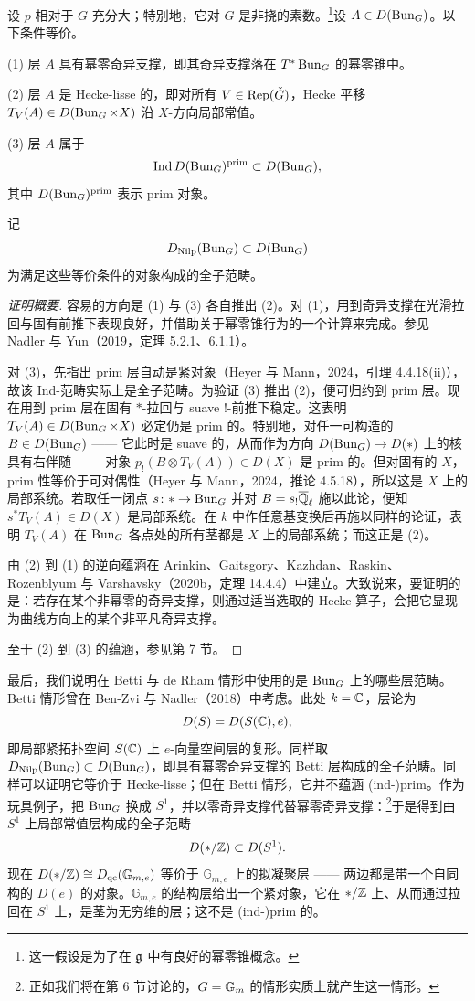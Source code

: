 \begin{theorem}
设 $p$ 相对于 $G$ 充分大；特别地，它对 $G$ 是非挠的素数。\footnote{这一假设是为了在 $\mathfrak{g}$ 中有良好的幂零锥概念。}设 $A\in D(\operatorname{Bun}_G)$。以下条件等价。

(1) 层 $A$ 具有幂零奇异支撑，即其奇异支撑落在 $T^*\operatorname{Bun}_G$ 的幂零锥中。

(2) 层 $A$ 是 Hecke-lisse 的，即对所有 $V\in\operatorname{Rep}(\check{G})$，Hecke 平移 $T_V(A)\in D(\operatorname{Bun}_G\times X)$ 沿 $X$-方向局部常值。

(3) 层 $A$ 属于
\[
\operatorname{Ind} D(\operatorname{Bun}_G)^{\mathrm{prim}}\subset D(\operatorname{Bun}_G),
\]
其中 $D(\operatorname{Bun}_G)^{\mathrm{prim}}$ 表示 prim 对象。

记
\[
D_{\mathrm{Nilp}}(\operatorname{Bun}_G)\subset D(\operatorname{Bun}_G)
\]
为满足这些等价条件的对象构成的全子范畴。
\end{theorem}

\begin{proof}[证明概要]
容易的方向是 (1) 与 (3) 各自推出 (2)。对 (1)，用到奇异支撑在光滑拉回与固有前推下表现良好，并借助关于幂零锥行为的一个计算来完成。参见 Nadler 与 Yun（2019，定理 5.2.1、6.1.1）。

对 (3)，先指出 prim 层自动是紧对象（Heyer 与 Mann，2024，引理 4.4.18(ii)），故该 Ind-范畴实际上是全子范畴。为验证 (3) 推出 (2)，便可归约到 prim 层。现在用到 prim 层在固有 $*$-拉回与 suave $!$-前推下稳定。这表明 $T_V(A)\in D(\operatorname{Bun}_G\times X)$ 必定仍是 prim 的。特别地，对任一可构造的 $B\in D(\operatorname{Bun}_G)$ —— 它此时是 suave 的，从而作为方向 $D(\operatorname{Bun}_G)\to D(*)$ 上的核具有右伴随 —— 对象 $p_!(B\otimes T_V(A))\in D(X)$ 是 prim 的。但对固有的 $X$，prim 性等价于可对偶性（Heyer 与 Mann，2024，推论 4.5.18），所以这是 $X$ 上的局部系统。若取任一闭点 $s\colon *\to\operatorname{Bun}_G$ 并对 $B=s_!\overline{\mathbb{Q}}_{\ell}$ 施以此论，便知 $s^*T_V(A)\in D(X)$ 是局部系统。在 $k$ 中作任意基变换后再施以同样的论证，表明 $T_V(A)$ 在 $\operatorname{Bun}_G$ 各点处的所有茎都是 $X$ 上的局部系统；而这正是 (2)。

由 (2) 到 (1) 的逆向蕴涵在 Arinkin、Gaitsgory、Kazhdan、Raskin、Rozenblyum 与 Varshavsky（2020b，定理 14.4.4）中建立。大致说来，要证明的是：若存在某个非幂零的奇异支撑，则通过适当选取的 Hecke 算子，会把它显现为曲线方向上的某个非平凡奇异支撑。

至于 (2) 到 (3) 的蕴涵，参见第 7 节。
\end{proof}

最后，我们说明在 Betti 与 de Rham 情形中使用的是 $\operatorname{Bun}_G$ 上的哪些层范畴。Betti 情形曾在 Ben-Zvi 与 Nadler（2018）中考虑。此处 $k=\mathbb{C}$，层论为
\[
D(S)=D(S(\mathbb{C}),e),
\]
即局部紧拓扑空间 $S(\mathbb{C})$ 上 $e$-向量空间层的复形。同样取 $D_{\mathrm{Nilp}}(\operatorname{Bun}_G)\subset D(\operatorname{Bun}_G)$，即具有幂零奇异支撑的 Betti 层构成的全子范畴。同样可以证明它等价于 Hecke-lisse；但在 Betti 情形，它并不蕴涵 (ind-)prim。作为玩具例子，把 $\operatorname{Bun}_G$ 换成 $S^1$，并以零奇异支撑代替幂零奇异支撑：\footnote{正如我们将在第 6 节讨论的，$G=\mathbb{G}_m$ 的情形实质上就产生这一情形。}于是得到由 $S^1$ 上局部常值层构成的全子范畴
\[
D(*/\mathbb{Z})\subset D(S^1).
\]
现在 $D(*/\mathbb{Z})\cong D_{\mathrm{qc}}(\mathbb{G}_{m,e})$ 等价于 $\mathbb{G}_{m,e}$ 上的拟凝聚层 —— 两边都是带一个自同构的 $D(e)$ 的对象。$\mathbb{G}_{m,e}$ 的结构层给出一个紧对象，它在 $*/\mathbb{Z}$ 上、从而通过拉回在 $S^1$ 上，是茎为无穷维的层；这不是 (ind-)prim 的。

